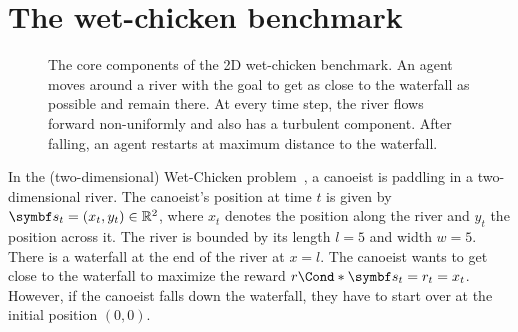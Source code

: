 \section{The wet-chicken benchmark}
\label{toc:interpretable_rl:wetchicken}
\begin{figure}[t]
    \centering
    
    \caption[Wet-Chicken dynamics]{
        \label{fig:interpretable_rl:wetchicken}
        The core components of the 2D wet-chicken benchmark.
        An agent moves around a river with the goal to get as close to the waterfall as possible and remain there.
        At every time step, the river flows forward non-uniformly and also has a turbulent component.
        After falling, an agent restarts at maximum distance to the waterfall.
    }
\end{figure}
In the (two-dimensional) Wet-Chicken problem~\parencite{tresp_wet_1994,hans_efficient_2009}, a canoeist is paddling in a two-dimensional river.
The canoeist's position at time $t$ is given by $\mat{s}_t = (x_t, y_t) \in \Rb^2$, where $x_t$ denotes the position along the river and $y_t$ the position across it.
The river is bounded by its length $l = 5$ and width $w = 5$.
There is a waterfall at the end of the river at $x = l$.
The canoeist wants to get close to the waterfall to maximize the reward $\Fun*{r}{\mat{s}_t} = r_t = x_t$.
However, if the canoeist falls down the waterfall, they have to start over at the initial position $(0, 0)$.

